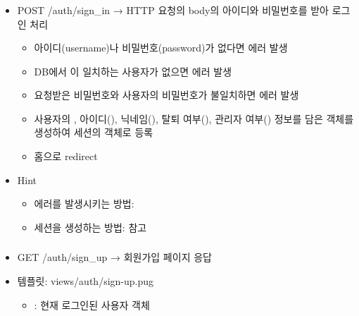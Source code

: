 \subsubsection*{}
\begin{itemize}
    \item POST /auth/sign\_in → HTTP 요청의 body의 아이디와 비밀번호를 받아 로그인 처리
    \begin{itemize}
        \item 아이디(username)나 비밀번호(password)가 없다면  에러 발생
        \item DB에서 이 일치하는 사용자가 없으면  에러 발생
        \item 요청받은 비밀번호와 사용자의 비밀번호가 불일치하면  에러 발생
        \item 사용자의 , 아이디(), 닉네임(), 탈퇴 여부(), 관리자 여부() 정보를 담은 객체를 생성하여 세션의  객체로 등록
        \item 홈으로 redirect
    \end{itemize}
    \item Hint
    \begin{itemize}
        \item {} 에러를 발생시키는 방법: 
        \item 세션을 생성하는 방법:  참고
    \end{itemize}
\end{itemize}

\subsubsection*{}
\begin{itemize}
    \item GET /auth/sign\_up → 회원가입 페이지 응답
    \item 템플릿: views/auth/sign-up.pug
    \begin{itemize}
        \item {}: 현재 로그인된 사용자 객체
    \end{itemize}
\end{itemize}

